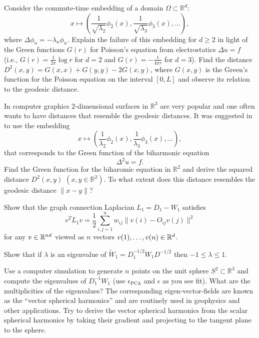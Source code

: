 \begin{myexercise}
Consider the commute-time embedding of a domain $\Omega \subset \mathbb{R}^d$:
$$x \mapsto (\frac{1}{\sqrt{\lambda_2}}\phi_2(x),\frac{1}{\sqrt{\lambda_3}}\phi_3(x),\ldots ),$$
where $\Delta \phi_n = -\lambda_n \phi_n$.
Explain the failure of this embedding for $d\geq 2$ in light of the Green functions $G(r)$ for Poisson's equation from electrostatics $\Delta u = f$ (i.e., $G(r)=\frac{1}{2\pi}\log r$ for $d=2$ and $G(r)=-\frac{1}{4\pi r}$ for $d=3$). Find the distance $D^2(x,y) = G(x,x)+G(y,y)-2G(x,y)$, where $G(x,y)$ is the Green's function for the Poisson equation on the interval $[0,L]$ and observe its relation to the geodesic distance.
\end{myexercise}


\begin{myexercise}
In computer graphics $2$-dimensional surfaces in $\mathbb{R}^3$ are very popular and one often wants to have distances that resemble the geodesic distances. It was suggested in \cite{Lipman:2010:BD} to use the embedding
$$x \mapsto (\frac{1}{\lambda_2}\phi_2(x),\frac{1}{\lambda_3}\phi_3(x),\ldots ),$$
that corresponds to the Green function of the biharmonic equation $$\Delta^2 u = f.$$
Find the Green function for the biharomic equation in $\mathbb{R}^2$  and derive the squared distance $D^2(x,y)$ $(x,y\in \mathbb{R}^2)$. To what extent does this distance resembles the geodesic distance $\|x-y\|$?    
\end{myexercise}

\begin{myexercise}
Show that the graph connection Laplacian $L_1 = D_1 - W_1$ satisfies 
$$v^T L_1 v = \frac{1}{2} \sum_{i,j=1}^n w_{ij} \|v(i) - O_{ij} v(j)\|^2$$
for any $v \in \mathbb{R}^{nd}$ viewed as $n$ vectors $v(1),\ldots, v(n) \in \mathbb{R}^d$.
\end{myexercise}

\begin{myexercise}
Show that if $\lambda$ is an eigenvalue of $\tilde{W}_1=D_1^{-1/2}W_1D^{-1/2}$ then $-1 \leq \lambda \leq 1$.     
\end{myexercise}


\begin{myexercise}
Use a computer simulation to generate $n$ points on the unit sphere $S^2 \subset \mathbb{R}^3$ and compute the eigenvalues of $D_1^{-1}W_1$ (use $\epsilon_{\text{PCA}}$ and $\epsilon$ as you see fit). What are the multiplicities of the eigenvalues? The corresponding eigen-vector-fields are known as the ``vector spherical harmonics'' and are routinely used in geophysics and other applications. Try to derive the vector spherical harmonics from the scalar spherical harmonics by taking their gradient and projecting to the tangent plane to the sphere.    
\end{myexercise}

